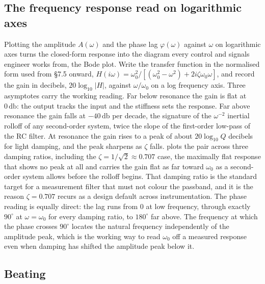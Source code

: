 \subsection{The frequency response read on logarithmic axes}

Plotting the amplitude $A(\omega)$ and the phase lag $\varphi(\omega)$
against $\omega$ on logarithmic axes turns the closed-form response into
the diagram every control and signals engineer works from, the Bode
plot. Write the transfer function in the normalised form used from \S7.5
onward, $H(i\omega) = \omega_{0}^{2}/[(\omega_{0}^{2} - \omega^{2}) +
2 i \zeta \omega_{0} \omega]$, and record the gain in decibels,
$20\log_{10}|H|$, against $\omega/\omega_{0}$ on a log frequency axis.
Three asymptotes carry the working reading. Far below resonance the gain
is flat at $0\,\si{\decibel}$: the output tracks the input and the
stiffness sets the response. Far above resonance the gain falls at
$-40\,\si{\decibel}$ per decade, the signature of the $\omega^{-2}$
inertial rolloff of any second-order system, twice the slope of the
first-order low-pass of the RC filter. At resonance the gain rises to a
peak of about $20\log_{10}Q$ decibels for light damping, and the peak
sharpens as $\zeta$ falls. 
plots the pair across three damping ratios, including the $\zeta =
1/\sqrt{2} \approx 0.707$ case, the maximally flat response that shows
no peak at all and carries the gain flat as far toward $\omega_{0}$ as a
second-order system allows before the rolloff begins. That damping ratio
is the standard target for a measurement filter that must not colour the
passband, and it is the reason $\zeta = 0.707$ recurs as a design
default across instrumentation. The phase reading is equally direct: the
lag runs from $0$ at low frequency, through exactly $90^{\circ}$ at
$\omega = \omega_{0}$ for every damping ratio, to $180^{\circ}$ far
above. The frequency at which the phase crosses $90^{\circ}$ locates the
natural frequency independently of the amplitude peak, which is the
working way to read $\omega_{0}$ off a measured response even when
damping has shifted the amplitude peak below it.



\subsection{Beating}

